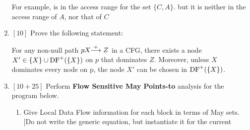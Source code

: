 \documentclass[12pt]{article}
\newcommand{\answer}[1]{{{\blue #1}}}
\renewcommand{\answer}[1]{\mbox{}}
\begin{document}
\begin{enumerate}
{{
For example,  is in the access range for the set $\{C, A\}$. but it is neither in the access range of $A$, nor that of $C$
}}

\answer{\clearpage}
\item $[10]$ Prove the following statement:

  For any non-null path $p\!\!\!:\!\! X\!\!\stackrel{+}{\longrightarrow} Z$ in a CFG, there exists a node \linebreak
  $X' \in \{X\} \cup \mbox{DF}^+(\{X\})$ on $p$ that dominates
  $Z$. Moreover, unless $X$ dominates every node on p, the node
  $X'$ can be chosen in $\idfp(\{X\})$.

\answer{
  \begin{enumerate}
  \item {\bf $X$ dominates every node in $p$}. Clearly $X$
    dominates $Z$.
  \item {\bf $X$ does not dominate every node in $p$}. Suppose the sequence of nodes in the path $p$ is $n_0 (=X), n_1, n_2, \ldots, n_k (=Z)$. Since $X$ does not dominate all nodes in $p$, some of the nodes in $p$ will be in $\idfp(\{X\})$ {\bf (WHY?)}. Let $n_j$ be the node in $\idfp(\{X\})$ such that it has the highest value of $j$. We claim that $X' = n_j$, i.e., $n_j$ dominates $Z$.
  Suppose $n_j$ does not dominate $Z = (n_k)$. Then, $\exists i, j < i \leq k$ such that $n_j$ does not dominate $n_i$. Choose smallest such $i$. We have, parent of $n_i$ dominated by $n_j$, but $n_i$ is not (strictly) dominated by $n_j$. This gives us:
  \begin{eqnarray*}
    &&n_i \in \mbox{DF}(\{n_j\})\\
       &\Rightarrow& n_i \in \idfp(\{n_j\})\\
       &\Rightarrow& n_i \in \idfp(\{X\})
  \end{eqnarray*}
But this contradicts the fact that $j$ is the largest index such that $n_j \in \idfp(\{X\}).$
  \end{enumerate}
}
\answer{\clearpage}
\item $[10 + 25]$ Perform {\bf Flow Sensitive May Points-to}
  analysis for the program below. 
  \begin{enumerate}
  \item Give Local Data Flow information for each block
    in terms of May sets. [Do not write the
      generic equation, but instantiate it for the current

\end{enumerate}
\end{enumerate}
\end{document}
